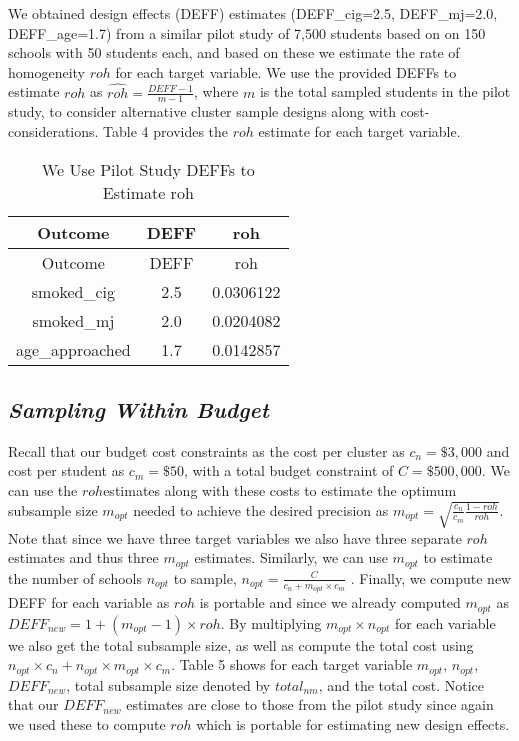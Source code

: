 \documentclass[
  12pt]{article}
\begin{document}
We obtained design effects (DEFF) estimates (DEFF\_cig=2.5,
DEFF\_mj=2.0, DEFF\_age=1.7) from a similar pilot study of 7,500
students based on on 150 schools with 50 students each, and based on
these we estimate the rate of homogeneity \(roh\) for each target
variable. We use the provided DEFFs to estimate \(roh\) as
\(\hat{roh} = \frac{DEFF-1}{m-1}\), where \(m\) is the total sampled
students in the pilot study, to consider alternative cluster sample
designs along with cost-considerations. Table 4 provides the \(roh\)
estimate for each target variable.

\begin{longtable}[]{@{}ccc@{}}
\caption{We Use Pilot Study DEFFs to Estimate roh}\tabularnewline
\toprule\noalign{}
Outcome & DEFF & roh \\
\midrule\noalign{}
\endfirsthead
\toprule\noalign{}
Outcome & DEFF & roh \\
\midrule\noalign{}
\endhead
\bottomrule\noalign{}
\endlastfoot
smoked\_cig & 2.5 & 0.0306122 \\
smoked\_mj & 2.0 & 0.0204082 \\
age\_approached & 1.7 & 0.0142857 \\
\end{longtable}

\subsection{\texorpdfstring{\emph{Sampling Within
Budget}}{Sampling Within Budget}}\label{sampling-within-budget}

Recall that our budget cost constraints as the cost per cluster as
\(c_n = \$3,000\) and cost per student as \(c_m = \$50\), with a total
budget constraint of \(C = \$500,000\). We can use the \(roh\)estimates
along with these costs to estimate the optimum subsample size
\(m_{opt}\) needed to achieve the desired precision as
\(m_{opt} = \sqrt{\frac{c_n}{c_m} \frac{1-roh}{roh}}\). Note that since
we have three target variables we also have three separate \(roh\)
estimates and thus three \(m_{opt}\) estimates. Similarly, we can use
\(m_{opt}\) to estimate the number of schools \(n_{opt}\) to sample,
\(n_{opt} = \frac{C}{c_n + m_{opt} \times c_m}\) . Finally, we compute
new DEFF for each variable as \(roh\) is portable and since we already
computed \(m_{opt}\) as \(DEFF_{new} = 1 + (m_{opt} - 1) \times roh\).
By multiplying \(m_{opt} \times n_{opt}\) for each variable we also get
the total subsample size, as well as compute the total cost using
\(n_{opt} \times c_n + n_{opt} \times m_{opt} \times c_m\). Table 5
shows for each target variable \(m_{opt}\), \(n_{opt}\), \(DEFF_{new}\),
total subsample size denoted by \(total_{nm}\), and the total cost.
Notice that our \(DEFF_{new}\) estimates are close to those from the
pilot study since again we used these to compute \(roh\) which is
portable for estimating new design effects.
\end{document}
